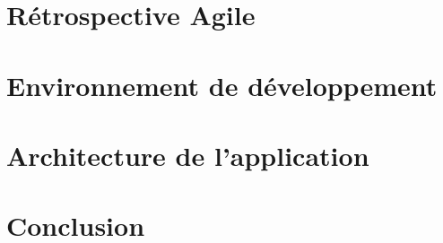 \begin{justify}
    \section{Rétrospective Agile}
      
    \section{Environnement de développement}
     
    \section{Architecture de l’application}
    
    \section*{\texorpdfstring{Conclusion}{Conclusion}}
    
\end{justify}